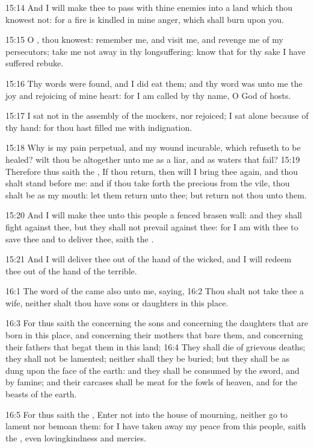 15:14 And I will make thee to pass with thine enemies into a land
which thou knowest not: for a fire is kindled in mine anger, which
shall burn upon you.

15:15 O \LORD, thou knowest: remember me, and visit me, and revenge me
of my persecutors; take me not away in thy longsuffering: know that
for thy sake I have suffered rebuke.

15:16 Thy words were found, and I did eat them; and thy word was unto
me the joy and rejoicing of mine heart: for I am called by thy name, O
\LORD God of hosts.

15:17 I sat not in the assembly of the mockers, nor rejoiced; I sat
alone because of thy hand: for thou hast filled me with indignation.

15:18 Why is my pain perpetual, and my wound incurable, which refuseth
to be healed? wilt thou be altogether unto me as a liar, and as waters
that fail?  15:19 Therefore thus saith the \LORD, If thou return, then
will I bring thee again, and thou shalt stand before me: and if thou
take forth the precious from the vile, thou shalt be as my mouth: let
them return unto thee; but return not thou unto them.

15:20 And I will make thee unto this people a fenced brasen wall: and
they shall fight against thee, but they shall not prevail against
thee: for I am with thee to save thee and to deliver thee, saith the
\LORD.

15:21 And I will deliver thee out of the hand of the wicked, and I
will redeem thee out of the hand of the terrible.

16:1 The word of the \LORD came also unto me, saying, 16:2 Thou shalt
not take thee a wife, neither shalt thou have sons or daughters in
this place.

16:3 For thus saith the \LORD concerning the sons and concerning the
daughters that are born in this place, and concerning their mothers
that bare them, and concerning their fathers that begat them in this
land; 16:4 They shall die of grievous deaths; they shall not be
lamented; neither shall they be buried; but they shall be as dung upon
the face of the earth: and they shall be consumed by the sword, and by
famine; and their carcases shall be meat for the fowls of heaven, and
for the beasts of the earth.

16:5 For thus saith the \LORD, Enter not into the house of mourning,
neither go to lament nor bemoan them: for I have taken away my peace
from this people, saith the \LORD, even lovingkindness and mercies.

